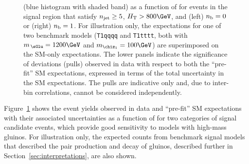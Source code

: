 \begin{figure}[!t]
{    (blue histogram with shaded band) as a function of \HTmiss for
    events in the signal region that satisfy $n_{\text{jet}} \geq 5$, $\scalht
    > 800\GeV$, and (left) $n_{\text{b}} = 0$ or (right) $n_{\text{b}} = 1$. For
    illustration only, the expectations for one of two benchmark
    models (\texttt{T1qqqq} and \texttt{T1tttt}, both with
    $m_{\,\sGlu} = 1200\GeV$ and $m_{\chiz_1} = 100\GeV$) are
    superimposed on the SM-only expectations. The lower panels
    indicate the significance of deviations (pulls) observed in data
    with respect to both the ``pre-fit'' SM expectations, expressed in
    terms of the total uncertainty in the SM expectations. The pulls
    are indicative only and, due to inter-bin correlations, cannot be
    considered independently. }
    \label{fig:mht-templates} 
\end{figure}

Figure~\ref{fig:mht-templates} shows the event yields observed in data
and ``pre-fit'' SM expectations with their associated uncertainties as
a function of \HTmiss for two categories of signal candidate events,
which provide good sensitivity to models with high-mass gluinos. For
illustration only, the expected counts from benchmark signal models
that described the pair production and decay of gluinos, described
further in Section~\ref{sec:interpretations}, are also shown.

%
%
%

